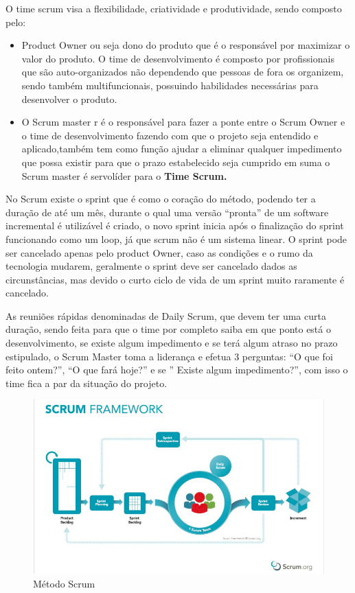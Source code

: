 \documentclass[
	12pt,				%
	oneside,			%
	a4paper,			%
  section=TITLE,
	brazil,				%
	]{abntex2}
\begin{document}
O time scrum visa a flexibilidade, criatividade e produtividade, sendo composto
pelo:

\begin{itemize}
  \item{Product Owner} ou seja dono do produto que é o responsável por
    maximizar o valor do produto. O time de desenvolvimento é composto por profissionais
    que são auto-organizados não dependendo que pessoas de fora os organizem, sendo
    também multifuncionais, possuindo habilidades necessárias para desenvolver o
    produto.
  \item{O Scrum master} r é o responsável para fazer a ponte entre o Scrum
    Owner e o time de desenvolvimento fazendo com que o projeto seja entendido
    e aplicado,também tem como função ajudar a eliminar qualquer impedimento
    que possa existir para que o prazo estabelecido seja cumprido em suma o
    Scrum master é servolíder para o \bfseries{Time Scrum}.
\end{itemize}

No Scrum existe o sprint que é como o coração do método, podendo ter a duração
de até um mês, durante o qual uma versão “pronta” de um software incremental é
utilizável é criado, o novo sprint inicia após o finalização do sprint
funcionando como um loop, já que scrum não é um sistema linear. O sprint pode
ser cancelado apenas pelo product Owner, caso as condições e o rumo da
tecnologia mudarem, geralmente o sprint deve ser cancelado dados as
circunstâncias, mas devido o curto ciclo de vida de um sprint muito raramente é
cancelado.

As reuniões rápidas denominadas de Daily Scrum, que devem ter uma curta
duração, sendo feita para que o time por completo saiba em que ponto está o
desenvolvimento, se existe algum impedimento e se terá algum atraso no prazo
estipulado, o Scrum Master toma a liderança e efetua 3 perguntas: “O que foi
feito ontem?”, “O que fará hoje?” e se ” Existe algum impedimento?”, com isso o
time fica a par da situação do projeto.

\begin{figure}[htb]
\caption{\label{fig_circulo}Método Scrum}
\begin{center}
\includegraphics[scale=0.45]{img/scrum.png}
\end{center}
\end{figure}
\end{document}
